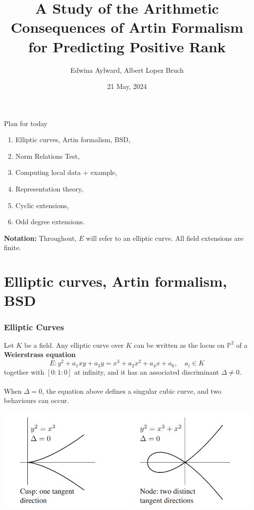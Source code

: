 \documentclass{beamer}
\title[Artin Formalism]{A Study of the Arithmetic Consequences of Artin Formalism for
Predicting Positive Rank}
\author{Edwina Aylward, Albert Lopez Bruch}
\date{21 May, 2024}
\newcommand{\BSD}{\mathrm{BSD}}
\theoremstyle{plain}
\begin{document}
\frame{\titlepage}

\begin{frame}{Plan for today}

\begin{enumerate}
    \itemsep\setlength{1em}
    \item Elliptic curves, Artin formalism, $\BSD$,
    \item Norm Relations Test,
    \item Computing local data + example, 
    \item Representation theory,
    \item Cyclic extensions,
    \item Odd degree extensions.\pause
\end{enumerate}
     
\vspace{1em}
\textbf{Notation:} Throughout, $E$ will refer to an elliptic curve. All field extensions are finite. 
\end{frame}

\section*{Elliptic curves, Artin formalism, BSD}
\frame{\sectionpage}

\begin{frame}
    \frametitle{Elliptic Curves}
    Let $K$ be a field. Any elliptic curve over $K$ can be written as the locus on $\mathbb{P}^2$ of a \textbf{Weierstrass equation}
    \begin{equation}
        E:y^2+a_1xy+a_3y=x^3+a_2x^2+a_4x+a_6,\quad a_i\in K
    \end{equation}
    together with $[0:1:0]$ at infinity, and it has an associated discriminant $\Delta\neq0$. \pause
    \\~\\
    When $\Delta=0$, the equation above defines a singular cubic curve, and two behaviours can occur.
    
    \centering
    \includegraphics[scale=0.4]{Singular_cubic.png}
\end{frame}
\end{document}
